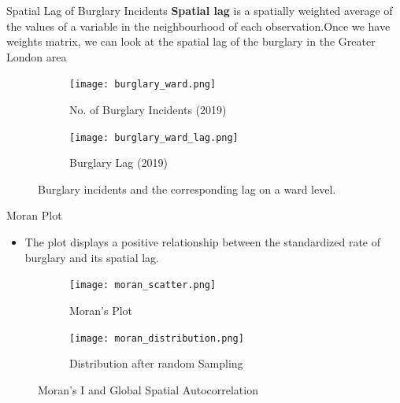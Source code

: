 \documentclass[10pt, aspectratio=169]{beamer}
\begin{document}
\begin{frame}{Spatial Lag of Burglary Incidents}
    \textbf{Spatial lag} is a spatially weighted average of the values of a
    variable in the neighbourhood of each observation.Once we have weights matrix,
    we can look at the spatial lag of the burglary in the Greater London area

    \begin{figure}
        \centering
            \begin{subfigure}[t]{0.4\textwidth}
                \texttt{[image: burglary\_ward.png]}
                \caption{No. of Burglary Incidents (2019)}\label{fig:burglary}
            \end{subfigure}
            \begin{subfigure}[t]{0.4\textwidth}
                \texttt{[image: burglary\_ward\_lag.png]}
                \caption{Burglary Lag (2019)}\label{fig:burglary_lag}
            \end{subfigure}
        \caption{Burglary incidents and the corresponding lag on a ward level.}\label{fig:lag}
    \end{figure}
\end{frame}



\begin{frame}{Moran Plot}
    \begin{itemize}
        \item \textbf{} The plot displays a positive relationship between the standardized rate of burglary and its spatial lag.

    \end{itemize}

    \begin{figure}
        \centering
            \begin{subfigure}[t]{0.4\textwidth}
                \texttt{[image: moran\_scatter.png]}
                \caption{Moran's Plot}\label{fig:moran_scatter}
            \end{subfigure}
            \begin{subfigure}[t]{0.4\textwidth}
                \texttt{[image: moran\_distribution.png]}
                \caption{Distribution after random Sampling}\label{fig:moran_distribution}
            \end{subfigure}
        \caption{Moran's I and Global Spatial Autocorrelation}\label{fig:moran}
    \end{figure}
\end{frame}
\end{document}
